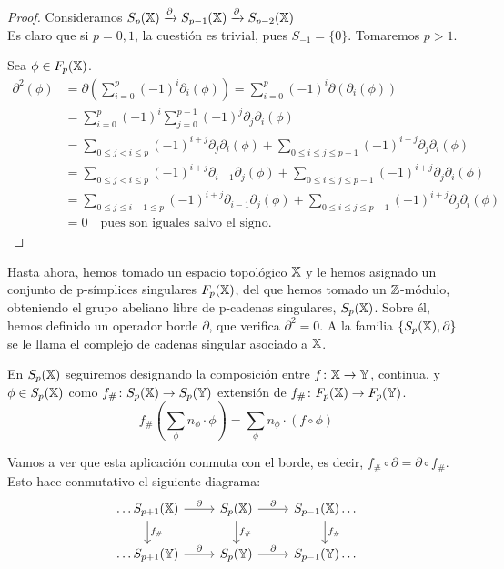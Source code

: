 \begin{proof}
  Consideramos $S_p({\mathbb X}) \xrightarrow{\partial} S_{p-1}({\mathbb X}) \xrightarrow{\partial} S_{p-2}({\mathbb X})$ \\
  Es claro que si $p = 0, 1$, la cuestión es trivial, pues $S_{-1} = \{0\}$. Tomaremos $p > 1$.

  Sea $\phi \in F_{p}({\mathbb X})$.
  \begin{align*}
    \partial^2(\phi) &= \partial(\sum_{i = 0}^p (-1)^i \partial_i(\phi)) = \sum_{i = 0}^p (-1)^i \partial(\partial_i(\phi)) \\
                     &= \sum_{i = 0}^p (-1)^i \sum_{j = 0}^{p-1} (-1)^j \partial_j \partial_i(\phi) \\
                     &= \sum_{0 \leq j < i \leq p} (-1)^{i + j} \partial_j \partial_i(\phi)
                        + \sum_{0 \leq i \leq j \leq p-1} (-1)^{i + j} \partial_j \partial_i(\phi) \\
                     &= \sum_{0 \leq j < i \leq p} (-1)^{i + j} \partial_{i-1} \partial_j(\phi)
                        + \sum_{0 \leq i \leq j \leq p-1} (-1)^{i + j} \partial_j \partial_i(\phi) \\
                     &= \sum_{0 \leq j \leq i-1 \leq p} (-1)^{i + j} \partial_{i-1} \partial_j(\phi)
                        + \sum_{0 \leq i \leq j \leq p-1} (-1)^{i + j} \partial_j \partial_i(\phi) \\
                     &= 0 \quad \text{pues son iguales salvo el signo.}
  \end{align*}
\end{proof}

Hasta ahora, hemos tomado un espacio topológico ${\mathbb X}$ y le hemos asignado un conjunto de p-símplices singulares $F_{p}({\mathbb X})$, del que
hemos tomado un $\mathbb{Z}$-módulo, obteniendo el grupo abeliano libre de p-cadenas singulares, $S_p({\mathbb X})$. Sobre él, hemos definido un
operador borde $\partial$, que verifica $\partial^2 = 0$. A la familia $\{S_p({\mathbb X}), \partial\}$ se le llama el complejo de cadenas
singular asociado a ${\mathbb X}$.

En $S_p({\mathbb X})$ seguiremos designando la composición entre $f \colon {\mathbb X} \to {\mathbb Y}$, continua, y $\phi \in S_p({\mathbb X})$ como $f_\# \colon S_p({\mathbb X}) \to S_p({\mathbb Y})$
extensión de $f_\# \colon F_{p}({\mathbb X}) \to F_{p}({\mathbb Y})$.
\[ f_\#(\sum_\phi n_\phi \cdot \phi) = \sum_\phi n_\phi \cdot (f \circ \phi) \]

Vamos a ver que esta aplicación conmuta con el borde, es decir, $f_\# \circ \partial = \partial \circ f_\#$. Esto hace conmutativo el siguiente diagrama:
\[
  \begin{tikzcd}
    \dots S_{p+1}(\X) \arrow{r}{\partial} \arrow{d}{f_\#} & S_p(\X) \arrow{r}{\partial} \arrow{d}{f_\#} & S_{p-1}(\X) \arrow{d}{f_\#} \dots \\
    \dots S_{p+1}(\Y) \arrow{r}{\partial}                 & S_p(\Y) \arrow{r}{\partial}                 & S_{p-1}(\Y) \dots
  \end{tikzcd}
\]

